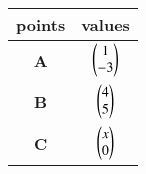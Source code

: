 \begin{tabular}{|c|c|}
\hline
\textbf{points} & \textbf{values}\\
\hline
\textbf{A} & $\begin{pmatrix}1\\-3\end{pmatrix}$\\
\hline
\textbf{B} & $\begin{pmatrix}4\\5\end{pmatrix}$\\
\hline
\textbf{C} & $\begin{pmatrix}x\\0\end{pmatrix}$\\
\hline
\end{tabular}
